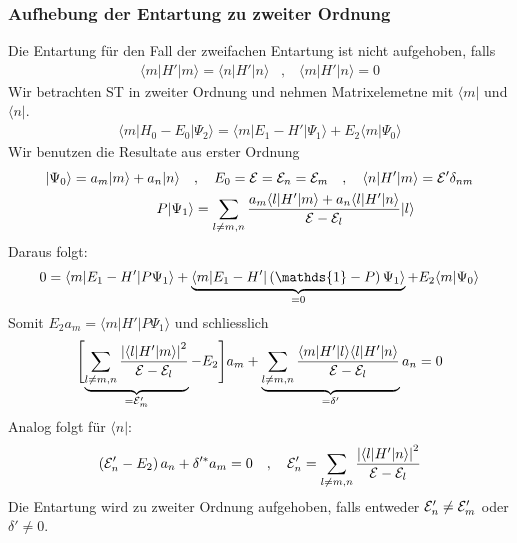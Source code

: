 \subsubsection{Aufhebung der Entartung zu zweiter Ordnung}

Die Entartung für den Fall der zweifachen Entartung ist nicht aufgehoben, falls
\begin{align*}
    \langle m | H' | m \rangle = \langle n | H' | n \rangle
    \hspace{10pt} , \hspace{10pt}
    \langle m | H' | n \rangle = 0
\end{align*}
Wir betrachten ST in zweiter Ordnung und nehmen Matrixelemetne mit $\langle m |$
und $\langle n |$.
\begin{align*}
    \langle m | H_0 - E_0 | \Psi_2 \rangle = \langle m | E_1 - H' | \Psi_1 \rangle
    + E_2 \langle m | \Psi_0 \rangle
\end{align*}
Wir benutzen die Resultate aus erster Ordnung
\begin{align*}
    |\Psi_0\rangle = a_m |m\rangle + a_n|n\rangle
    \hspace{10pt} &, \hspace{10pt} E_0 = \mathcal{E} = \mathcal{E}_n = \mathcal{E}_m
    \hspace{10pt} , \hspace{10pt} \langle n | H' | m \rangle = \mathcal{E}' \delta_{nm}
    \\
    P | \Psi_1 \rangle &= \sum_{l \neq m,n}
    \frac{a_m \langle l | H' | m \rangle + a_n \langle l | H' | n \rangle}{\mathcal{E} - \mathcal{E}_l} |l\rangle
\end{align*}
Daraus folgt:
\begin{align*}
    0 = \langle m | E_1 - H' | P \Psi_1 \rangle +
    \underbrace{\langle m | E_1 - H' | \klammer{\mathds{1} - P} \Psi_1 \rangle}_{=0}
    + E_2 \langle m | \Psi_0 \rangle
\end{align*}
Somit $E_2 a_m = \langle m | H' | P \Psi_1 \rangle$ und schliesslich
\begin{align*}
    \Biggl[\underbrace{\sum_{l \neq m,n} \frac{\left\vert \langle l | H' | m \rangle \right\vert^2}{\mathcal{E} - \mathcal{E}_l}}_{=\mathcal{E}_m'} - E_2 \Biggr] a_m
    + \underbrace{\sum_{l \neq m,n} \frac{\langle m | H' | l \rangle \langle l | H' | n \rangle}{\mathcal{E} - \mathcal{E}_l}}_{= \delta'} a_n = 0
\end{align*}
Analog folgt für $\langle n |$:
\begin{align*}
    \left( \mathcal{E}_n' - E_2 \right) a_n + \delta'^\ast a_m = 0
    \hspace{10pt} , \hspace{10pt}
    \mathcal{E}_n' = \sum_{l \neq m,n} \frac{\left\vert \langle l | H' | n \rangle \right\vert^2}{\mathcal{E} - \mathcal{E}_l}
\end{align*}
Die Entartung wird zu zweiter Ordnung aufgehoben, falls entweder $\mathcal{E}_n' \neq \mathcal{E}_m'$
oder $\delta' \neq 0$.


